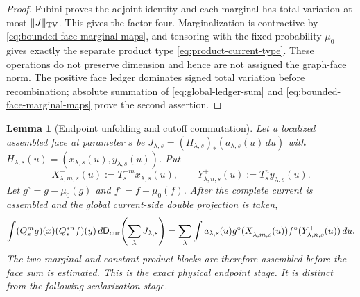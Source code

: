 \documentclass[11pt]{article}
\newtheorem{lemma}[theorem]{Lemma}
\begin{document}
\begin{proof}
Fubini proves the adjoint identity and each marginal has total variation at
most $\|J\|_{\rm TV}$.  This gives the factor four.  Marginalization is
contractive by \eqref{eq:bounded-face-marginal-maps}, and tensoring with the
fixed probability $\mu_0$ gives exactly the separate product type
\eqref{eq:product-current-type}.  These operations do not preserve dimension
and hence are not assigned the graph-face norm.  The positive face ledger
dominates signed total variation before recombination; absolute summation of
\eqref{eq:global-ledger-sum} and
\eqref{eq:bounded-face-marginal-maps} prove the second assertion.
\end{proof}

\begin{lemma}[Endpoint unfolding and cutoff commutation]
\label{lem:endpoint-unfolding}
Let a localized assembled face at parameter $s$ be
$J_{\lambda,s}=(H_{\lambda,s})_*(a_{\lambda,s}(u)\,du)$ with
$H_{\lambda,s}(u)=(x_{\lambda,s}(u),y_{\lambda,s}(u))$.  Put
\begin{equation}
\label{eq:physical-endpoint-maps}
 X^-_{\lambda,m,s}(u):=T_s^{-m}x_{\lambda,s}(u),\qquad
 Y^+_{\lambda,n,s}(u):=T_s^{n}y_{\lambda,s}(u).
\end{equation}
Let $g^\circ=g-\mu_0(g)$ and $f^\circ=f-\mu_0(f)$.  After the complete
current is assembled and the global current-side double projection is taken,
\begin{equation}
\label{eq:exact-endpoint-unfolding}
 \int (Q_s^mg)(x)(Q_s^{*n}f)(y)\,
       d\mathsf D_{\rm cur}\!\left(\sum_\lambda J_{\lambda,s}\right)
 =\sum_\lambda\int a_{\lambda,s}(u)
   g^\circ(X^-_{\lambda,m,s}(u))
   f^\circ(Y^+_{\lambda,n,s}(u))\,du.
\end{equation}
The two marginal and constant product blocks are therefore assembled before
the face sum is estimated.  This is the exact \emph{physical endpoint}
stage.  It is distinct from the following scalarization stage.


\end{lemma}
\end{document}

